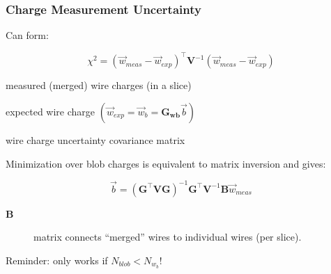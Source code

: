 \begin{frame}
  \frametitle{Charge Measurement Uncertainty}

  Can form:

  \[\chi^2 = (\vec{w}_{meas}-\vec{w}_{exp})^\intercal\mathbf{V}^{-1} (\vec{w}_{meas}-\vec{w}_{exp})\]

  \vspace{3mm}

  \begin{description}\footnotesize
  \item[$\vec{w}_{meas}$] measured (merged) wire charges (in a slice)
  \item[$\vec{w}_{exp}$] expected wire charge $(\vec{w}_{exp} = \vec{w}_b = \mathbf{G_{wb}}\vec{b})$
  \item[$\mathbf{V}$] wire charge uncertainty covariance matrix
  \end{description}

  \vspace{3mm}

  \footnotesize{Minimization over blob charges is equivalent to matrix inversion and
  gives:}

  \[\vec{b} = (\mathbf{G}^\intercal\mathbf{V}\mathbf{G})^{-1}\mathbf{G}^\intercal\mathbf{V}^{-1}\mathbf{B}\vec{w}_{meas} \]

  \footnotesize
  \begin{description}
  \item[$\mathbf{B}$] matrix connects ``merged'' wires to individual wires (per slice).
  \end{description}

  \begin{center}
    Reminder: only works if $N_{blob} < N_{w_b}$!
  \end{center}
\end{frame}


